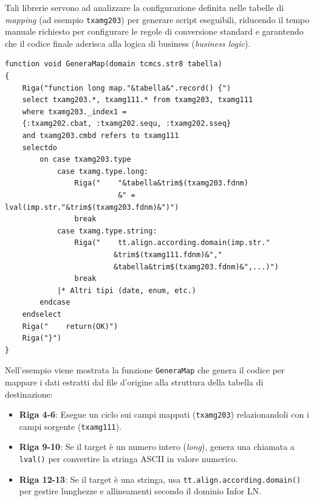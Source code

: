 Tali librerie servono ad analizzare la configurazione definita nelle tabelle di \textit{mapping} (ad esempio \texttt{txamg203})
per generare script eseguibili, riducendo il tempo manuale richiesto per configurare le regole di conversione
standard e garantendo che il codice finale aderisca alla logica di business (\textit{business logic}).

\begin{listing}[H]
\begin{verbatim}
function void GeneraMap(domain tcmcs.str8 tabella)
{
    Riga("function long map."&tabella&".record() {")
    select txamg203.*, txamg111.* from txamg203, txamg111
    where txamg203._index1 =
    {:txamg202.cbat, :txamg202.sequ, :txamg202.sseq}
    and txamg203.cmbd refers to txamg111
    selectdo
        on case txamg203.type
            case txamg.type.long:
                Riga("    "&tabella&trim$(txamg203.fdnm)
                          &" = lval(imp.str."&trim$(txamg203.fdnm)&")")
                break
            case txamg.type.string:
                Riga("    tt.align.according.domain(imp.str."
                         &trim$(txamg111.fdnm)&","
                         &tabella&trim$(txamg203.fdnm)&",...)")
                break
            |* Altri tipi (date, enum, etc.)
        endcase
    endselect
    Riga("    return(OK)")
    Riga("}")
}
\end{verbatim}
\caption{Logica generazione della funzione di mapping (da \texttt{txamgdll0013}).}
\label{lst:mapping_gen}
\end{listing}

Nell'esempio viene mostrata la funzione \texttt{GeneraMap} che genera il codice per mappare i dati estratti dal
file d'origine alla struttura della tabella di destinazione:
\begin{itemize}
    \item \textbf{Riga 4-6}: Esegue un ciclo sui campi mappati (\texttt{txamg203}) relazionandoli con i campi sorgente (\texttt{txamg111}).
    \item \textbf{Riga 9-10}: Se il target è un numero intero (\textit{long}), genera una chiamata a \texttt{lval()} per convertire la stringa ASCII in valore numerico.
    \item \textbf{Riga 12-13}: Se il target è una stringa, usa \texttt{tt.align.according.domain()} per gestire lunghezze e allineamenti secondo il dominio Infor LN.
\end{itemize}

